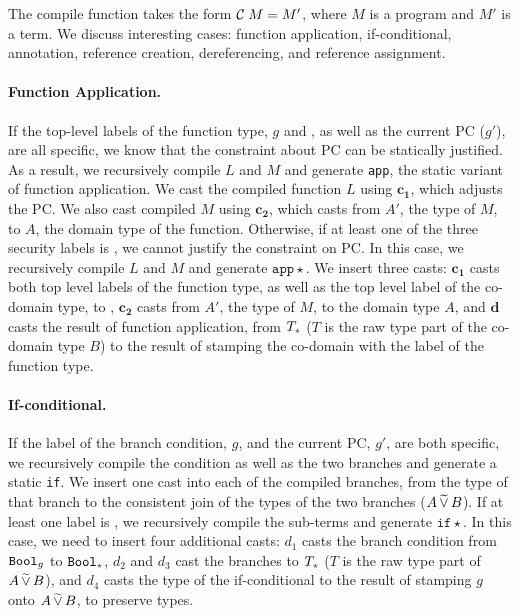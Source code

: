 {\color{NavyBlue} %

The compile function takes the form $\mathcal{C}\;{M} = M'$, where $M$ is a \Surface
program and $M'$ is a \CC term. We discuss interesting cases: function
application, if-conditional, annotation, reference creation, dereferencing, and
reference assignment.

\paragraph{Function Application.}
If the top-level labels of the function type, $g$ and \gc, as well as the
current PC ($g'$), are all specific, we know that the constraint about PC can be
statically justified. As a result, we recursively compile $L$ and $M$ and
generate \texttt{app}, the static variant of function application. We cast the
compiled function $L$ using $\bm{c_1}$, which adjusts the PC. We also cast
compiled $M$ using $\bm{c_2}$, which casts from $A'$, the type of $M$, to $A$,
the domain type of the function. Otherwise, if at least one of the three
security labels is \unk, we cannot justify the constraint on PC. In this case,
we recursively compile $L$ and $M$ and generate $\mathtt{app}{\star}$. We insert
three casts: $\bm{c_1}$ casts both top level labels of the function type, as
well as the top level label of the co-domain type, to \unk, $\bm{c_2}$ casts
from $A'$, the type of $M$, to the domain type $A$, and $\bm{d}$ casts the result of
function application, from $T_{\unk}$ ($T$ is the raw type part of the co-domain
type $B$) to the result of stamping the co-domain with the label of the function
type.

\paragraph{If-conditional.}
If the label of the branch condition, $g$, and the current PC, $g'$, are both
specific, we recursively compile the condition as well as the two branches and
generate a static \texttt{if}. We insert one cast into each of the compiled
branches, from the type of that branch to the consistent join of the types of
the two branches ($A \,\widetilde{\vee}\, B$). If at least one label is \unk, we
recursively compile the sub-terms and generate $\mathtt{if}{\star}$. In this
case, we need to insert four additional casts: $d_1$ casts the branch condition
from $\mathtt{Bool}_g$ to $\Bool_{\unk}$, $d_2$ and $d_3$ cast the branches to
$T_{\unk}$ ($T$ is the raw type part of $A \,\widetilde{\vee}\, B$), and $d_4$ casts the
type of the if-conditional to the result of stamping $g$ onto $A \,\widetilde{\vee}\, B$,
to preserve types.

}
